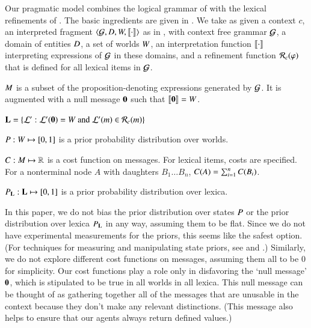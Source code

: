 \documentclass[leqno,12pt]{article}
\begin{document}
Our pragmatic model combines the logical grammar of
 with the lexical refinements of
. The basic ingredients are given in
. We take as given a context $c$, an interpreted
fragment $\langle \mathcal{G}, D, W, \llbracket\cdot\rrbracket \rangle$ as in
, with context free grammar $\mathcal{G}$, a domain
of entities $D$, a set of worlds $W$, an interpretation
function $\llbracket\cdot\rrbracket$ interpreting expressions of $\mathcal{G}$ in these
domains, and a refinement function $\mathcal{R}_{c}(\varphi)$ that is defined
for all lexical items in $\mathcal{G}$.
%
\begin{examples}
\item\label{modobjects}
  \begin{examples}
  \item\label{messages} $M$ is a subset of the
    proposition-denoting expressions generated by $\mathcal{G}$. It is
    augmented with a null message $\mathbf{0}$ such that
    $\llbracket\mathbf{0}\rrbracket = W$.

  \item\label{lexset}%
    $\mathbf{L} = \left\{ \mathcal{L}' :  \mathcal{L}'(\mathbf{0}) = W \text{ and } \mathcal{L}'(m) \in \mathcal{R}_{c}(m) \right\}$             
  
  \item $P : W \mapsto [0,1]$ is a prior probability
    distribution over worlds.

  \item $C : M \mapsto \mathbb{R}$ is a cost function on
    messages.  For lexical items, costs are specified. For a
    nonterminal node $A$ with daughters $B_{1} \ldots B_{n}$,
    $C(A) = \sum_{i=1}^{n}C(B_{i})$.

  \item $P_{\mathbf{L}} : \mathbf{L} \mapsto [0,1]$ is a prior probability
    distribution over lexica.
  \end{examples}
\end{examples}

In this paper, we do not bias the prior distribution over states
$P$ or the prior distribution over lexica $P_{\mathbf{L}}$ in any
way, assuming them to be flat. Since we do not have experimental
measurements for the priors, this seems like the safest option. (For
techniques for measuring and manipulating state priors, see
\citealt{Frank:Goodman:2012} and
\citealt{Stiller:Goodman:Frank:2011}.)  Similarly, we do not explore
different cost functions on messages, assuming them all to be $0$ for
simplicity. Our cost functions play a role only in disfavoring the
`null message' $\mathbf{0}$, which is stipulated to be true in all
worlds in all lexica. This null message can be thought of as gathering
together all of the messages that are unusable in the context because
they don't make any relevant distinctions. (This message also helps to
ensure that our agents always return defined values.)
\end{document}
